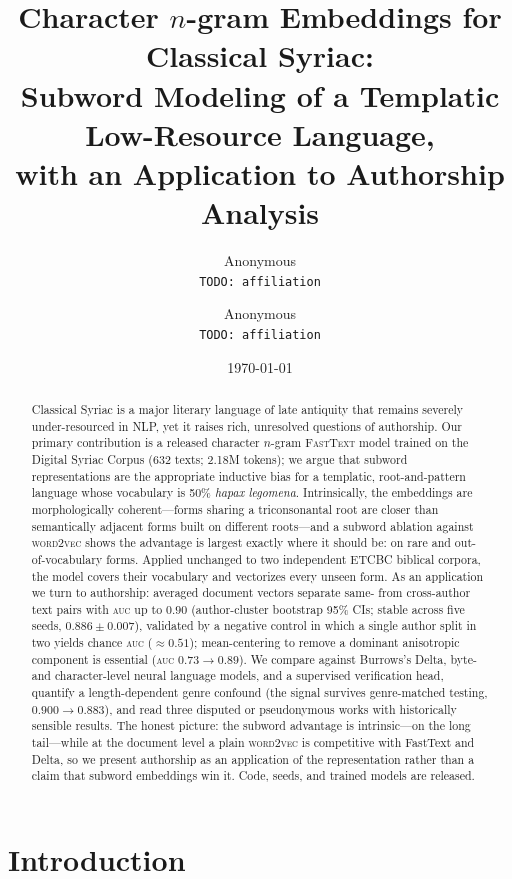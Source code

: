\documentclass[11pt]{article}
\title{Character $n$-gram Embeddings for Classical Syriac:\\
Subword Modeling of a Templatic Low-Resource Language,\\
with an Application to Authorship Analysis}
\author{Anonymous\\ \texttt{TODO: affiliation} \and Anonymous\\ \texttt{TODO: affiliation}}
\date{\today}
\newcommand{\auc}{\textsc{auc}}
\newcommand{\auc}{\textsc{auc}}
\begin{document}
\maketitle

\begin{abstract}
Classical Syriac is a major literary language of late antiquity that remains
severely under-resourced in NLP, yet it raises rich, unresolved questions of
authorship. Our primary contribution is a released character $n$-gram
\textsc{FastText} model trained on the Digital Syriac Corpus (632 texts; 2.18M
tokens); we argue that subword representations are the appropriate inductive bias
for a templatic, root-and-pattern language whose vocabulary is 50\% \emph{hapax
legomena}. Intrinsically, the embeddings are morphologically coherent---forms
sharing a triconsonantal root are closer than semantically adjacent forms built
on different roots---and a subword ablation against \textsc{word2vec} shows the
advantage is largest exactly where it should be: on rare and out-of-vocabulary
forms. Applied unchanged to two independent ETCBC biblical corpora, the model
covers their vocabulary and vectorizes every unseen form. As an application we
turn to authorship: averaged document vectors separate same- from cross-author
text pairs with \auc{} up to $0.90$ (author-cluster bootstrap 95\% CIs; stable
across five seeds, $0.886\pm0.007$), validated by a negative control in which a
single author split in two yields chance \auc{} ($\approx 0.51$); mean-centering
to remove a dominant anisotropic component is essential (\auc{} $0.73\to0.89$). We
compare against Burrows's Delta, byte- and character-level neural language models,
and a supervised verification head, quantify a length-dependent genre confound
(the signal survives genre-matched testing, $0.900\to0.883$), and read three
disputed or pseudonymous works with historically sensible results. The honest
picture: the subword advantage is intrinsic---on the long tail---while at the
document level a plain \textsc{word2vec} is competitive with FastText and Delta,
so we present authorship as an application of the representation rather than a
claim that subword embeddings win it. Code, seeds, and trained models are
released.
\end{abstract}

\section{Introduction}
\label{sec:intro}
\end{document}

